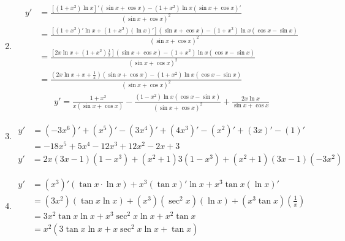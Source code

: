 \begin{solution}
\begin{enumerate}
\begin{align*}
              \end{align*}
        \item \begin{align*}
                  y' & = \frac{[(1+x^2)\ln x]'(\sin x + \cos x) - (1+x^2)\ln x (\sin x + \cos x)'}{(\sin x + \cos x)^2}                  \\
                     & = \frac{[(1+x^2)'\ln x + (1+x^2)(\ln x)'](\sin x + \cos x) - (1+x^2)\ln x (\cos x - \sin x)}{(\sin x + \cos x)^2} \\
                     & = \frac{[2x \ln x + (1+x^2)\frac{1}{x}](\sin x + \cos x) - (1+x^2)\ln x (\cos x - \sin x)}{(\sin x + \cos x)^2}   \\
                     & = \frac{(2x \ln x + x + \frac{1}{x})(\sin x + \cos x) - (1+x^2)\ln x (\cos x - \sin x)}{(\sin x + \cos x)^2}
              \end{align*}
              \begin{align*}
                  y' = \frac{1+x^2}{x(\sin x + \cos x)} - \frac{(1-x^2)\ln x (\cos x - \sin x)}{(\sin x + \cos x)^2} + \frac{2x \ln x}{\sin x + \cos x}
              \end{align*}
        \item \begin{align*}
                  y' & = (-3x^6)' + (x^5)' - (3x^4)' + (4x^3)' - (x^2)' + (3x)' - (1)' \\
                     & = -18x^5 + 5x^4 - 12x^3 + 12x^2 - 2x + 3
              \end{align*}
              \begin{align*}
                  y' & = 2x (3x-1)(1-x^3) + (x^2+1)3(1-x^3) + (x^2+1)(3x-1)(-3x^2)
              \end{align*}
        \item \begin{align*}
                  y' & = (x^3)' (\tan x \cdot \ln x) + x^3 (\tan x)' \ln x + x^3 \tan x (\ln x)'                  \\
                     & = (3x^2) (\tan x \ln x) + (x^3) (\sec^2 x) (\ln x) + (x^3 \tan x) \left(\frac{1}{x}\right) \\
                     & = 3x^2 \tan x \ln x + x^3 \sec^2 x \ln x + x^2 \tan x                                      \\
                     & =x^2(3\tan x \ln x+ x \sec^2 x \ln x + \tan x)
              \end{align*}
    \end{enumerate}
\end{solution}

